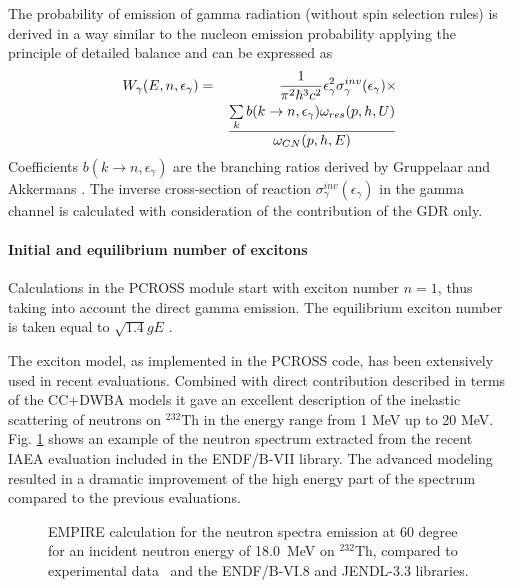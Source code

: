 The probability of emission of gamma radiation (without spin selection
rules) is derived in a way similar to the nucleon emission probability
applying the principle of detailed balance \cite{Pluyko:78,Betak:79,Akkermans:85} and can be expressed as%
\begin{eqnarray}
W_{\gamma }(E,n,\epsilon _{\gamma })&=&\frac{1}{\pi ^{2}\hbar ^{3}c^{2}}%
\epsilon _{\gamma }^{2}\sigma _{\gamma }^{inv}(\epsilon _{\gamma })\times
\notag \\
&&\frac{\sum\limits_{k}b(k\rightarrow n,\epsilon _{\gamma })\omega
_{res}(p,h,U)}{\omega _{CN}(p,h,E)}
\end{eqnarray}%
Coefficients $b(k\rightarrow n,\epsilon _{\gamma })$ are the branching
ratios derived by Gruppelaar and Akkermans \cite{Akkermans:85}. The inverse
cross-section of reaction $\sigma _{\gamma }^{inv}(\epsilon _{\gamma })$ in
the gamma channel is calculated with consideration of the contribution of
the GDR only.

\paragraph{Initial and equilibrium number of excitons}

Calculations in the PCROSS module start with exciton number $n=1$, thus
taking into account the direct gamma emission. The equilibrium exciton
number is taken equal to $\sqrt{1.4}gE$ \cite{Shang:88,Shang:89}.

\bigskip


The exciton model, as implemented in the PCROSS code, has been extensively
used in recent evaluations. Combined with direct
contribution described in terms of the CC+DWBA models it gave an excellent description of the inelastic scattering of neutrons on $^{232}$Th in the energy range from 1 MeV up to 20 MeV. Fig. \ref{thspectra} shows an example of the neutron spectrum extracted from the recent IAEA evaluation included in the ENDF/B-VII library. The advanced modeling resulted in a dramatic improvement of the high energy part of the spectrum compared to the previous evaluations.

\begin{figure}[htbp]
\caption{EMPIRE calculation for the neutron spectra emission at 60 degree
for an incident neutron energy of 18.0~MeV on $^{232}$Th, compared to
experimental data~\protect\cite{mats} and the ENDF/B-VI.8 and JENDL-3.3
libraries.}
\label{thspectra}
\end{figure}

